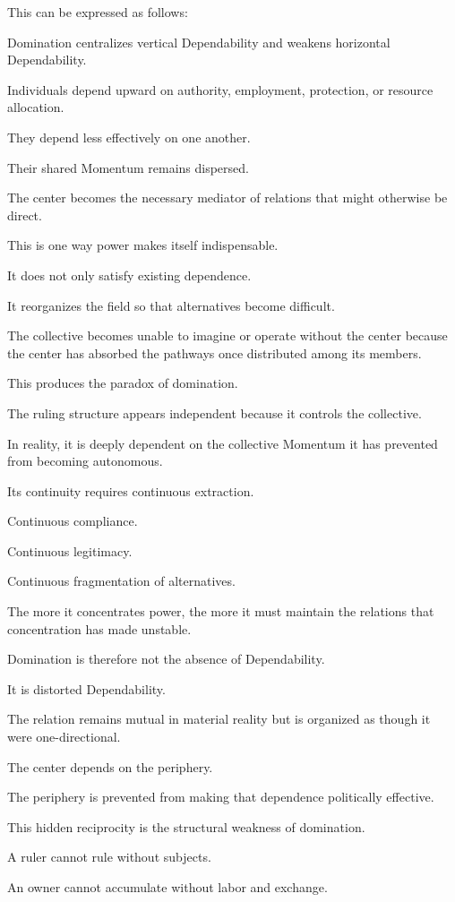 This can be expressed as follows:

Domination centralizes vertical Dependability and weakens horizontal Dependability.

Individuals depend upward on authority, employment, protection, or resource allocation.

They depend less effectively on one another.

Their shared Momentum remains dispersed.

The center becomes the necessary mediator of relations that might otherwise be direct.

This is one way power makes itself indispensable.

It does not only satisfy existing dependence.

It reorganizes the field so that alternatives become difficult.

The collective becomes unable to imagine or operate without the center because the center has absorbed the pathways once distributed among its members.

This produces the paradox of domination.

The ruling structure appears independent because it controls the collective.

In reality, it is deeply dependent on the collective Momentum it has prevented from becoming autonomous.

Its continuity requires continuous extraction.

Continuous compliance.

Continuous legitimacy.

Continuous fragmentation of alternatives.

The more it concentrates power, the more it must maintain the relations that concentration has made unstable.

Domination is therefore not the absence of Dependability.

It is distorted Dependability.

The relation remains mutual in material reality but is organized as though it were one-directional.

The center depends on the periphery.

The periphery is prevented from making that dependence politically effective.

This hidden reciprocity is the structural weakness of domination.

A ruler cannot rule without subjects.

An owner cannot accumulate without labor and exchange.

